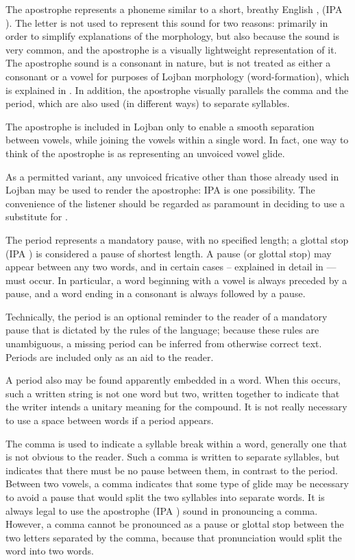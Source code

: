 The apostrophe represents a phoneme similar to a short, breathy English , (IPA ). The letter  is not used to represent this sound for two reasons: primarily in order to simplify explanations of the morphology, but also because the sound is very common, and the apostrophe is a visually lightweight representation of it. The apostrophe sound is a consonant in nature, but is not treated as either a consonant or a vowel for purposes of Lojban morphology (word-formation), which is explained in . In addition, the apostrophe visually parallels the comma and the period, which are also used (in different ways) to separate syllables.

The apostrophe is included in Lojban only to enable a smooth separation between vowels, while joining the vowels within a single word. In fact, one way to think of the apostrophe is as representing an unvoiced vowel glide.

As a permitted variant, any unvoiced fricative other than those already used in Lojban may be used to render the apostrophe: IPA  is one possibility. The convenience of the listener should be regarded as paramount in deciding to use a substitute for .

The period represents a mandatory pause, with no specified length; a glottal stop (IPA ) is considered a pause of shortest length. A pause (or glottal stop) may appear between any two words, and in certain cases -- explained in detail in  --- must occur. In particular, a word beginning with a vowel is always preceded by a pause, and a word ending in a consonant is always followed by a pause.

Technically, the period is an optional reminder to the reader of a mandatory pause that is dictated by the rules of the language; because these rules are unambiguous, a missing period can be inferred from otherwise correct text. Periods are included only as an aid to the reader.

A period also may be found apparently embedded in a word. When this occurs, such a written string is not one word but two, written together to indicate that the writer intends a unitary meaning for the compound. It is not really necessary to use a space between words if a period appears.

The comma is used to indicate a syllable break within a word, generally one that is not obvious to the reader. Such a comma is written to separate syllables, but indicates that there must be no pause between them, in contrast to the period. Between two vowels, a comma indicates that some type of glide may be necessary to avoid a pause that would split the two syllables into separate words. It is always legal to use the apostrophe (IPA ) sound in pronouncing a comma. However, a comma cannot be pronounced as a pause or glottal stop between the two letters separated by the comma, because that pronunciation would split the word into two words.

